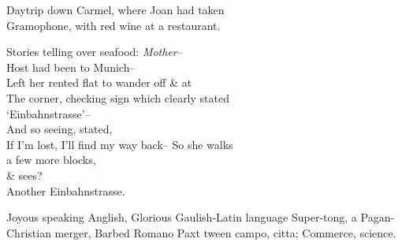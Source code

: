 Daytrip down Carmel, where Joan had taken \\
Gramophone, with red wine at a restaurant.

Stories telling over seafood: \textit{Mother}-- \\
Host had been to Munich-- \\
Left her rented flat to wander off \& at \\
The corner, checking sign which clearly stated \\
`Einbahnstrasse'-- \\
And so seeing, stated, \\
If I'm lost, I'll find my way back--
So she walks \\
a few more blocks, \\
\& sees? \\
Another Einbahnstrasse.

Joyous speaking Anglish,
Glorious Gaulish-Latin language
Super-tong, a
Pagan-Christian merger, 
Barbed Romano
Paxt tween campo, citta;
Commerce, science.